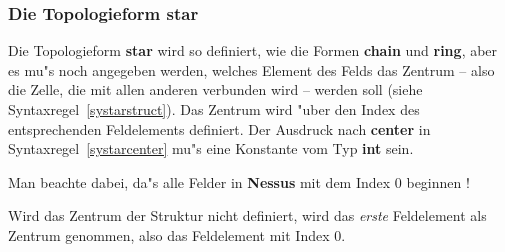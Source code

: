 \begin{center}
\end{center}





\subsubsection{Die Topologieform {\bf star}}

  Die
Topologieform {\bf star} wird so definiert, wie die Formen
{\bf chain} und {\bf ring}, aber es mu"s noch
angegeben werden, welches Element des Felds das Zentrum -- also die
Zelle, die mit allen anderen verbunden wird -- werden soll (siehe
Syntaxregel~\ref{systarstruct}). Das Zentrum wird "uber den Index des
entsprechenden Feldelements definiert. Der Ausdruck nach {\bf
center} in Syntaxregel~\ref{systarcenter} mu"s eine
Konstante vom Typ {\bf
int} sein.

Man beachte dabei, da"s alle Felder in {\bf Nessus} mit
dem Index 0 beginnen !

Wird das Zentrum der Struktur nicht definiert,
wird das {\it erste\/} Feldelement als Zentrum genommen, also das
Feldelement mit Index 0.

